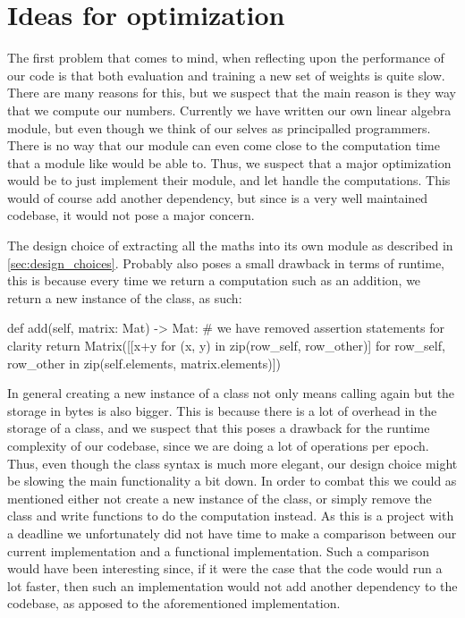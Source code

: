 \documentclass[a4paper,oneside,article,english]{memoir}
\begin{document}
\section{Ideas for optimization}  
\label{sec:ideas_for_optimization}

The first problem that comes to mind, when reflecting upon the performance of
our code is that both evaluation and training a new set of weights is quite
slow. There are many reasons for this, but we suspect that the main reason is
they way that we compute our numbers. Currently we have written our own linear
algebra module, but even though we think of our selves as principalled
programmers. There is no way that our module can even come close to the
computation time that a module like  would be able to. Thus,
we suspect that a major optimization would be to just implement their module,
and let  handle the computations. This would of course
add another dependency, but since  is a very well maintained
codebase, it would not pose a major concern.

The design choice of extracting all the maths into its own module as described
in \cref{sec:design_choices}. Probably also poses a small drawback in terms of
runtime, this is because every time we return a computation such as an addition,
we return a new instance of the class, as such:
\begin{python}
def add(self, matrix: Mat) -> Mat: 
  # we have removed assertion statements for clarity
  return Matrix([[x+y for (x, y) in zip(row_self, row_other)] for row_self, row_other in zip(self.elements, matrix.elements)])
\end{python}
In general creating a new instance of a class not only means calling
 again but the storage in bytes is also bigger.
This is because there is a lot of overhead in the storage of a class, and we
suspect that this poses a drawback for the runtime complexity of our codebase,
since we are doing a lot of operations per epoch. Thus, even though the class
syntax is much more elegant, our design choice might be slowing the main
functionality a bit down. In order to combat this we could as mentioned either
not create a new instance of the class, or simply remove the class and write
functions to do the computation instead. As this is a project with a deadline we
unfortunately did not have time to make a comparison between our current
implementation and a functional implementation. Such a comparison would have
been interesting since, if it were the case that the code would run a lot
faster, then such an implementation would not add another dependency to the
codebase, as apposed to the aforementioned  implementation.
\end{document}
